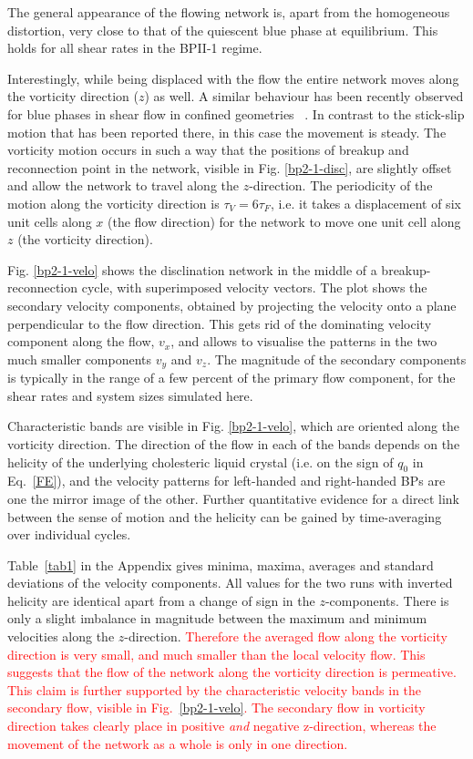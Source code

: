 \documentclass[8.5pt,twoside,twocolumn]{article}
\newcommand{\rev}[1]{{\textcolor{red}{#1}}}
\begin{document}
The general appearance of the flowing network is, apart from the homogeneous distortion,
very close to that of the quiescent blue phase at equilibrium. This holds for all
shear rates in the BPII-1 regime.

Interestingly, while being displaced with the flow the entire network moves 
along the vorticity direction ($z$) as well.  A similar behaviour has been recently 
observed for blue phases in shear flow in confined geometries ~\cite{Henrich:2012b}.
In contrast to the stick-slip motion that has been reported there,
in this case the movement is steady. 
The vorticity motion occurs in such a way that the positions of breakup and reconnection 
point in the network, visible in Fig. \ref{bp2-1-disc}, are slightly offset and allow the network 
to travel along the $z$-direction. The periodicity of the motion along the vorticity direction
is $\tau_V=6\tau_F$, 
i.e. it takes a displacement of six unit cells along $x$ (the flow direction) 
for the network to move one unit cell along $z$ (the vorticity direction).

Fig. \ref{bp2-1-velo} shows the disclination network in the middle of a breakup-reconnection
cycle, with superimposed velocity vectors.
The plot shows the secondary velocity components, obtained by projecting the
velocity onto a plane perpendicular to the flow direction.
This gets rid of the dominating velocity component along the flow, $v_x$, and 
allows to visualise the patterns in the 
two much smaller components $v_y$ and $v_z$.
The magnitude of the secondary components is typically in the range of a 
few percent of the primary flow component, for the shear rates 
and system sizes simulated here.

Characteristic bands are visible in Fig. \ref{bp2-1-velo}, which are 
oriented along the vorticity direction. The direction of the flow
in each of the bands depends on the helicity of the underlying cholesteric
liquid crystal (i.e. on the sign of $q_0$ in Eq.~\ref{FE}), and the velocity
patterns for left-handed and right-handed BPs are one the mirror image of
the other. 
Further quantitative evidence for a direct link between the sense of motion 
and the helicity can be gained by time-averaging over individual cycles.

Table~\ref{tab1} in the Appendix 
gives minima, maxima, averages and standard deviations 
of the velocity components.
All values for the two runs with inverted helicity are identical apart 
from a change of sign in the $z$-components.
There is only a slight imbalance in magnitude 
between the maximum and minimum velocities 
along the $z$-direction. 
\rev{
Therefore the averaged flow along the vorticity
direction is very small, and much smaller than
the local velocity flow. This suggests that the
flow of the network along the vorticity 
direction is permeative. This claim is further supported by the characteristic 
velocity bands in the secondary flow, visible in Fig.~\ref{bp2-1-velo}. 
The secondary flow in vorticity direction takes clearly place in positive {\em and} 
negative z-direction, whereas the movement of the network as a whole is only in one direction.
}
\end{document}
